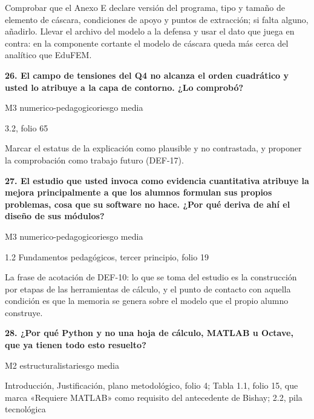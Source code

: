 {\small{}Comprobar que el Anexo E declare versión del programa, tipo y tamaño de elemento de cáscara, condiciones de apoyo y puntos de extracción; si falta alguno, añadirlo. Llevar el archivo del modelo a la defensa y usar el dato que juega en contra: en la componente cortante el modelo de cáscara queda más cerca del analítico que EduFEM.\par}
\vspace{5pt}
\noindent\casilla\textbf{26. El campo de tensiones del Q4 no alcanza el orden cuadrático y usted lo atribuye a la capa de contorno. ¿Lo comprobó?}\par
{\small\color{gris}\sffamily M3 numerico-pedagogico\quad{}\quad riesgo media}\par
{\small{}3.2, folio 65\par}
{\small{}Marcar el estatus de la explicación como plausible y no contrastada, y proponer la comprobación como trabajo futuro (DEF-17).\par}
\vspace{5pt}
\noindent\casilla\textbf{27. El estudio que usted invoca como evidencia cuantitativa atribuye la mejora principalmente a que los alumnos formulan sus propios problemas, cosa que su software no hace. ¿Por qué deriva de ahí el diseño de sus módulos?}\par
{\small\color{gris}\sffamily M3 numerico-pedagogico\quad{}\quad riesgo media}\par
{\small{}1.2 Fundamentos pedagógicos, tercer principio, folio 19\par}
{\small{}La frase de acotación de DEF-10: lo que se toma del estudio es la construcción por etapas de las herramientas de cálculo, y el punto de contacto con aquella condición es que la memoria se genera sobre el modelo que el propio alumno construye.\par}
\vspace{5pt}
\noindent\casilla\textbf{28. ¿Por qué Python y no una hoja de cálculo, MATLAB u Octave, que ya tienen todo esto resuelto?}\par
{\small\color{gris}\sffamily M2 estructuralista\quad{}\quad riesgo media}\par
{\small{}Introducción, Justificación, plano metodológico, folio 4; Tabla 1.1, folio 15, que marca «Requiere MATLAB» como requisito del antecedente de Bishay; 2.2, pila tecnológica\par}
